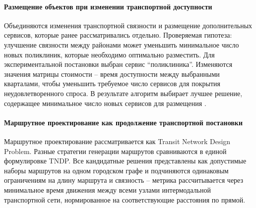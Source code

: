 \paragraph*{Размещение объектов при изменении транспортной доступности}
Объединяются изменения транспортной связности и размещение дополнительных сервисов, которые ранее рассматривались отдельно. Проверяемая гипотеза: улучшение связности между районами может уменьшить минимальное число новых поликлиник, которые необходимо оптимально разместить. Для экспериментальной постановки выбран сервис ``поликлиника''. Изменяются значения матрицы стоимости -- время доступности между выбранными кварталами, чтобы уменьшить требуемое число сервисов для покрытия неудовлетворенного спроса. В результате алгоритм выбирает лучшее решение, содержащее минимальное число новых сервисов для размещения \cite{kontsevik2024connectivityPlacement}.

\paragraph*{Маршрутное проектирование как продолжение транспортной постановки}
Маршрутное проектирование рассматривается как Transit Network Design Problem. Разные стратегии генерации маршрутов сравниваются в единой формулировке TNDP. Все кандидатные решения представлены как допустимые наборы маршрутов на одном городском графе и подчиняются одинаковым ограничениям на длину маршрута и связность -- метрика рассчитывается через минимальное время движения между всеми узлами интермодальной транспортной сети, нормированное на соответствующие расстояния по прямой.
